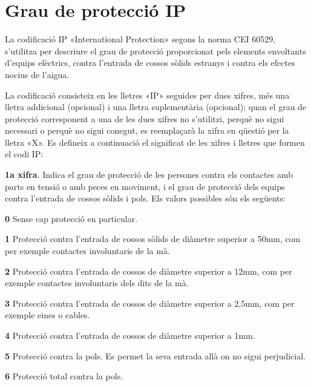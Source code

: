\section{Grau de protecció IP}   

La codificació IP «International Protection»  segons la
norma CEI 60529, s'utilitza per descriure el grau de
protecció  proporcionat pels elements envoltants d'equips elèctrics, contra
l'entrada de cossos sòlids estranys i contra els efectes nocius
de l'aigua.

La codificació consisteix en les lletres «IP»
seguides per dues xifres, més una lletra addicional (opcional) i una
lletra suplementària (opcional); quan el grau de protecció
corresponent a una de les dues xifres no s'utilitzi, perquè no sigui
necessari o perquè no sigui conegut, es reemplaçarà la xifra en
qüestió per la lletra «X». Es defineix a continuació el
significat de les xifres i lletres que formen el codi IP:

\textbf{1a xifra}. Indica el grau de protecció de les persones contra els contactes amb
parts en tensió o amb peces en moviment, i el grau de protecció dels equips contra l'entrada de cossos sòlids i pols. Els valors possibles són els següents:
\begin{list}{}
   {\setlength{\labelwidth}{10mm} \setlength{\leftmargin}{10mm} \setlength{\labelsep}{2mm}}
   \item[\textbf{0}] Sense cap protecció en particular.
   \item[\textbf{1}] Protecció contra l'entrada de cossos sòlids de diàmetre superior a 50\unit{mm},
   com per exemple   contactes involuntaris de la mà.
   \item[\textbf{2}] Protecció contra l'entrada de cossos de diàmetre superior a 12\unit{mm}, com per exemple
   contactes involuntaris dels dits de la mà.
   \item[\textbf{3}] Protecció contra l'entrada de cossos de diàmetre superior a 2,5\unit{mm},
   com per exemple eines o cables.
   \item[\textbf{4}] Protecció contra l'entrada de cossos de diàmetre superior a 1\unit{mm}.
   \item[\textbf{5}] Protecció contra la pols. Es permet la seva entrada allà on no sigui perjudicial.
   \item[\textbf{6}] Protecció total contra la pols.
\end{list}

